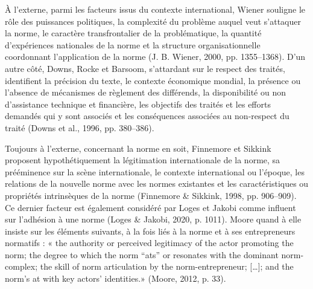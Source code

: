 \documentclass[12pt]{ulaval}
\begin{document}
À l'externe, parmi les facteurs issus du contexte international, Wiener souligne le rôle des puissances politiques, la complexité du problème auquel veut s'attaquer la norme, le caractère transfrontalier de la problématique, la quantité d'expériences nationales de la norme et la structure organisationnelle coordonnant l'application de la norme (J. B. Wiener, 2000, pp. 1355--1368). D'un autre côté, Downs, Rocke et Barsoom, s'attardant sur le respect des traités, identifient la précision du texte, le contexte économique mondial, la présence ou l'absence de mécanismes de règlement des différends, la disponibilité ou non d'assistance technique et financière, les objectifs des traités et les efforts demandés qui y sont associés et les conséquences associées au non-respect du traité (Downs et al., 1996, pp. 380--386).

Toujours à l'externe, concernant la norme en soit, Finnemore et Sikkink proposent hypothétiquement la légitimation internationale de la norme, sa prééminence sur la scène internationale, le contexte international ou l'époque, les relations de la nouvelle norme avec les normes existantes et les caractéristiques ou propriétés intrinsèques de la norme (Finnemore \& Sikkink, 1998, pp. 906--909). Ce dernier facteur est également considéré par Loges et Jakobi comme influent sur l'adhésion à une norme (Loges \& Jakobi, 2020, p. 1011). Moore quand à elle insiste sur les éléments suivants, à la fois liés à la norme et à ses entrepreneurs normatifs : « the authority or perceived legitimacy of the actor promoting the norm; the degree to which the norm ``ats'' or resonates with the dominant norm-complex; the skill of norm articulation by the norm-entrepreneur; {[}\ldots{]}; and the norm's at with key actors' identities.» (Moore, 2012, p. 33).
\end{document}
